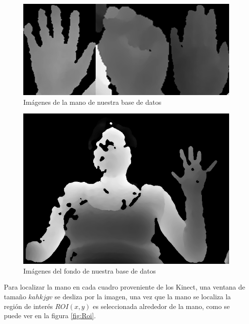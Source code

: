 \begin{figure}[!h]
\begin{center}
\includegraphics[scale=.5]{./Figures/TrainingImages.png}
\end{center}
\caption{Imágenes de la mano de nuestra base de datos}
\label{fig:ImagenesPoses}
\end{figure}  

\begin{figure}[!h]
\begin{center}
\includegraphics[scale=.5]{./Figures/166_W13.png}
\end{center}
\caption{Imágenes del fondo de nuestra base de datos}
\label{fig:ImagenFondo}
\end{figure}  

Para localizar la mano en cada cuadro proveniente de los Kinect, una ventana de tamaño $kahkjgv$ se desliza por la imagen, una vez que la mano se localiza la región de interés $ROI(x,y)$ es seleccionada alrededor de la mano, como se puede ver en la figura \ref{fig:Roi}.

